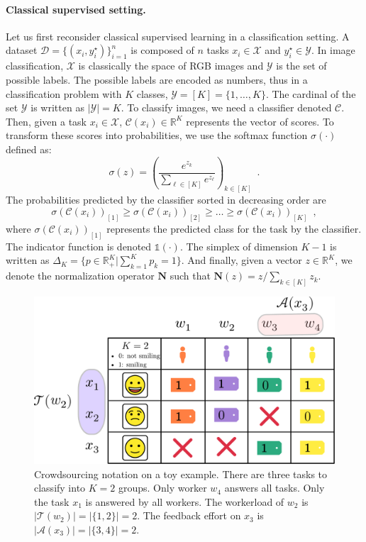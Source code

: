 \paragraph*{Classical supervised setting.}Let us first reconsider classical supervised learning in a classification setting.
A dataset $\mathcal{D}=\{(x_i, y_i^\star)\}_{i=1}^n$ is composed of $n$ tasks $x_i\in\mathcal{X}$ and $y_i^\star\in\mathcal{Y}$.
In image classification, $\mathcal{X}$ is classically the space of RGB images and $\mathcal{Y}$ is the set of possible labels.
The possible labels are encoded as numbers, thus in a classification problem with $K$ classes, $\mathcal{Y}=[K]=\{1,\dots,K\}$.
The cardinal of the set $\mathcal{Y}$ is written as $|\mathcal{Y}|=K$.
To classify images, we need a classifier denoted $\mathcal{C}$.
Then, given a task $x_i\in\mathcal{X}$, $\mathcal{C}(x_i)\in\mathbb{R}^K$ represents the vector of scores.
To transform these scores into probabilities, we use the softmax function $\sigma(\cdot)$ defined as:
$$
\sigma(z) = \left(\frac{e^{z_k}}{\sum_{\ell\in [K]} e^{z_\ell}}\right)_{k\in [K]} \enspace.
$$
The probabilities predicted by the classifier sorted in decreasing order are
$$
\sigma(\mathcal{C}(x_i))_{[1]} \geq \sigma(\mathcal{C}(x_i))_{[2]}\geq \dots\geq \sigma(\mathcal{C}(x_i))_{[K]} \enspace,
$$
where $\sigma(\mathcal{C}(x_i))_{[1]}$ represents the predicted class for the task by the classifier.
The indicator function is denoted $\mathds{1}(\cdot)$. The simplex of dimension $K-1$ is written as $\Delta_K=\{p \in\mathbb{R}^K_+ | \sum_{k=1}^K p_k = 1\}$.
And finally, given a vector $z\in\mathbb{R}^K$, we denote the normalization operator $\mathbf{N}$ such that $\mathbf{N}(z) = z / \sum_{k\in[K]}z_k$.

\begin{figure}[thb]
    \centering
    \includegraphics[width=.7\textwidth]{chapters/images/notations.pdf}
    \caption{Crowdsourcing notation on a toy example. There are three tasks to classify into $K=2$ groups. Only worker $w_4$ answers all tasks. Only the task $x_1$ is answered by all workers. The workerload of $w_2$ is $|\mathcal{T}(w_2)|=|\{1,2\}|=2$. The feedback effort on $x_3$ is $|\mathcal{A}(x_3)|=|\{3,4\}|=2$.}
    \label{fig:enter-label}
\end{figure}

